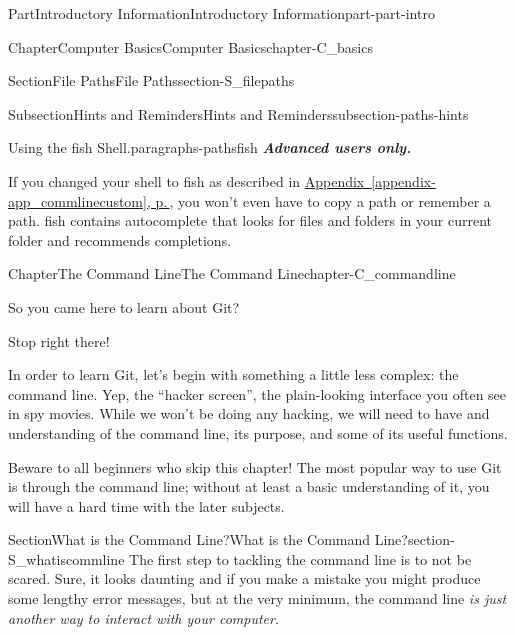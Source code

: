 \documentclass[twoside,10pt,]{book}
\newcommand{\xreffont}{\relax}
\newcommand{\alert}[1]{\textbf{\textit{#1}}}
\begin{document}
\begin{partptx}{Part}{Introductory Information}{}{Introductory Information}{}{}{part-part-intro}
\begin{chapterptx}{Chapter}{Computer Basics}{}{Computer Basics}{}{}{chapter-C_basics}
\begin{sectionptx}{Section}{File Paths}{}{File Paths}{}{}{section-S_filepaths}
\begin{subsectionptx}{Subsection}{Hints and Reminders}{}{Hints and Reminders}{}{}{subsection-paths-hints}
\begin{paragraphs}{Using the fish Shell.}{paragraphs-pathsfish}
%
%
%
\alert{Advanced users only.}%
\par
If you changed your shell to fish as described in \hyperref[appendix-app_commlinecustom]{Appendix~{\xreffont\ref{appendix-app_commlinecustom}}, p.\,\pageref{appendix-app_commlinecustom}}, you won't even have to copy a path or remember a path. fish contains autocomplete that looks for files and folders in your current folder and recommends completions.%
\end{paragraphs}%
\end{subsectionptx}
\end{sectionptx}
\end{chapterptx}
%
\typeout{************************************************}
\typeout{************************************************}
%
\begin{chapterptx}{Chapter}{The Command Line}{}{The Command Line}{}{}{chapter-C_commandline}
\renewcommand*{\chaptername}{Chapter}
\begin{introduction}{}%
So you came here to learn about Git?%
\par
Stop right there!%
\par
In order to learn Git, let's begin with something a little less complex: the command line. Yep, the ``hacker screen'', the plain-looking interface you often see in spy movies. While we won't be doing any hacking, we will need to have and understanding of the command line, its purpose, and some of its useful functions.%
\par
Beware to all beginners who skip this chapter! The most popular way to use Git is through the command line; without at least a basic understanding of it, you will have a hard time with the later subjects.%
\end{introduction}%
%
%
\typeout{************************************************}
\typeout{************************************************}
%
\begin{sectionptx}{Section}{What is the Command Line?}{}{What is the Command Line?}{}{}{section-S_whatiscommline}
%
%
%
%
%
The first step to tackling the command line is to not be scared. Sure, it looks daunting and if you make a mistake you might produce some lengthy error messages, but at the very minimum, the command line \emph{is just another way to interact with your computer}.%

\end{sectionptx}
\end{chapterptx}
\end{partptx}
\end{document}
